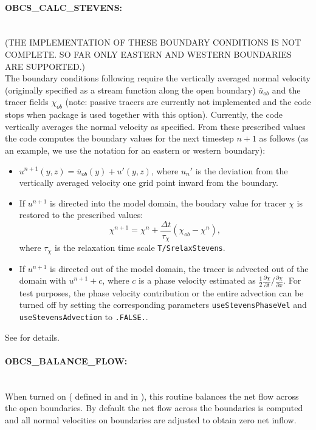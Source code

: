 \paragraph{OBCS\_CALC\_STEVENS:} ~ \\
(THE IMPLEMENTATION OF THESE BOUNDARY CONDITIONS IS NOT COMPLETE. SO
FAR ONLY EASTERN AND WESTERN BOUNDARIES ARE SUPPORTED.) \\
The boundary conditions following \citet{stevens:90} require the
vertically averaged normal velocity (originally specified as a stream
function along the open boundary) $\bar{u}_{ob}$ and the tracer fields
$\chi_{ob}$ (note: passive tracers are currently not implemented and
the code stops when package  is used together with this
option). Currently, the code vertically averages the normal velocity
as specified. From these prescribed values the code computes the
boundary values for the next timestep $n+1$ as follows (as an 
example, we use the notation for an eastern or western boundary):
\begin{itemize}
\item $u^{n+1}(y,z) = \bar{u}_{ob}(y) + u'(y,z)$, where $u_{n}'$ is the
  deviation from the vertically averaged velocity one grid point
  inward from the boundary.
\item If $u^{n+1}$ is directed into the model domain, the boudary
  value for tracer $\chi$ is restored to the prescribed values:
  \[\chi^{n+1} =   \chi^{n} + \frac{\Delta{t}}{\tau_\chi} (\chi_{ob} -
  \chi^{n}),\] where $\tau_\chi$ is the relaxation time
  scale \texttt{T/SrelaxStevens}.
\item If $u^{n+1}$ is directed out of the model domain, the tracer is
  advected out of the domain with $u^{n+1}+c$, where $c$ is a phase
  velocity estimated as
  $\frac{1}{2}\frac{\partial\chi}{\partial{t}}/\frac{\partial\chi}{\partial{x}}$.
  For test purposes, the phase velocity contribution or the entire
  advection can
  be turned off by setting the corresponding parameters
  \texttt{useStevensPhaseVel} and \texttt{useStevensAdvection} to
  \texttt{.FALSE.}.\end{itemize} See \citet{stevens:90} for details.

\paragraph{OBCS\_BALANCE\_FLOW:} ~ \\
%
When turned on (
defined in  and  in
), this routine balances the net flow
across the open boundaries. By default the net flow across the
boundaries is computed and all normal velocities on boundaries are
adjusted to obtain zero net inflow.

